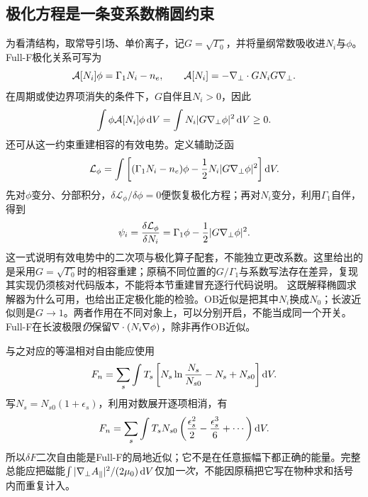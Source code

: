 \documentclass[UTF8,a4paper,11pt,openany,fontset=fandol]{ctexbook}
\begin{document}
\subsection{极化方程是一条变系数椭圆约束}
为看清结构，取常导引场、单价离子，记$G=\sqrt{\Gamma_0}$，并将量纲常数吸收进$N_i$与$\phi$。Full-F极化关系可写为
\begin{equation}
 \mathcal A[N_i]\phi=\Gamma_1N_i-n_e,\qquad
 \mathcal A[N_i]=-\nabla_\perp\cdot G N_i G\nabla_\perp .
\end{equation}
在周期或使边界项消失的条件下，$G$自伴且$N_i>0$，因此
\begin{equation}
 \int\phi\mathcal A[N_i]\phi\,\mathrm d V
 =\int N_i|G\nabla_\perp\phi|^2\,\mathrm d V\ge0.
\end{equation}
还可从这一约束重建相容的有效电势。定义辅助泛函
\begin{equation}
 \mathcal L_\phi=\int\left[(\Gamma_1N_i-n_e)\phi
             -{1\over2}N_i|G\nabla_\perp\phi|^2\right]\mathrm d V.
\end{equation}
先对$\phi$变分、分部积分，$\delta\mathcal L_\phi/\delta\phi=0$便恢复极化方程；再对$N_i$变分，利用$\Gamma_1$自伴，得到
\begin{equation}
 \psi_i={\delta\mathcal L_\phi\over\delta N_i}
       =\Gamma_1\phi-{1\over2}|G\nabla_\perp\phi|^2.
\end{equation}
这一式说明有效电势中的二次项与极化算子配套，不能独立更改系数。这里给出的是采用$G=\sqrt{\Gamma_0}$时的相容重建；原稿不同位置的$G/\Gamma_1$与系数写法存在差异，复现其实现仍须核对代码版本，不能将本节重建冒充逐行代码说明。
这既解释椭圆求解器为什么可用，也给出正定极化能的检验。OB近似是把其中$N_i$换成$N_0$；长波近似则是$G\to1$。两者作用在不同对象上，可以分别开启，不能当成同一个开关。Full-F在长波极限\emph{仍}保留$\nabla\cdot(N_i\nabla\phi)$，除非再作OB近似。

与之对应的等温相对自由能应使用
\begin{equation}
 F_n=\sum_s\int T_s\left[N_s\ln{N_s\over N_{s0}}-N_s+N_{s0}\right]\mathrm d V.
\end{equation}
写$N_s=N_{s0}(1+\epsilon_s)$，利用对数展开逐项相消，有
\begin{equation}
 F_n=\sum_s\int T_sN_{s0}
 \left({\epsilon_s^2\over2}-{\epsilon_s^3\over6}+\cdots\right)\mathrm d V.
\end{equation}
所以$\delta F$二次自由能是Full-F的局地近似；它不是在任意振幅下都正确的能量。完整总能应把磁能$\int|\nabla_\perp A_\parallel|^2/(2\mu_0)\,\mathrm d V$仅加\emph{一次}，不能因原稿把它写在物种求和括号内而重复计入。
\end{document}
